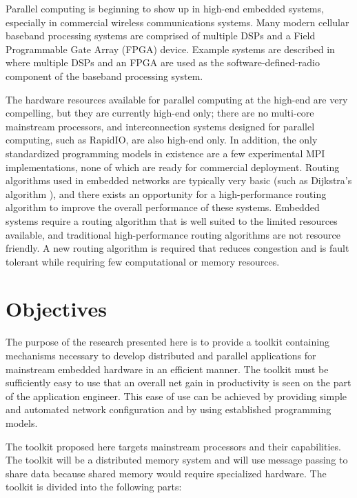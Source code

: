 Parallel computing is beginning to show up in high-end embedded systems, especially in commercial wireless communications systems. Many modern cellular baseband processing systems are comprised of multiple DSPs and a Field Programmable Gate Array (FPGA) device. Example systems are described in \cite{ref:2007-wilson-using_serial_rapidio_switches} where multiple DSPs and an FPGA are used as the software-defined-radio component of the baseband processing system.

The hardware resources available for parallel computing at the high-end are very compelling, but they are currently high-end only; there are no multi-core mainstream processors, and interconnection systems designed for parallel computing, such as RapidIO, are also high-end only. In addition, the only standardized programming models in existence are a few experimental MPI implementations, none of which are ready for commercial deployment. Routing algorithms used in embedded networks are typically very basic (such as Dijkstra's algorithm \cite{ref:2006-black-dijkstras_algorithm}), and there exists an opportunity for a high-performance routing algorithm to improve the overall performance of these systems. Embedded systems require a routing algorithm that is well suited to the limited resources available, and traditional high-performance routing algorithms are not resource friendly. A new routing algorithm is required that reduces congestion and is fault tolerant while requiring few computational or memory resources.

\section{Objectives}\label{sec:introduction:objectives}

The purpose of the research presented here is to provide a toolkit containing mechanisms necessary to develop distributed and parallel applications for mainstream embedded hardware in an efficient manner. The toolkit must be sufficiently easy to use that an overall net gain in productivity is seen on the part of the application engineer. This ease of use can be achieved by providing simple and automated network configuration and by using established programming models.

The toolkit proposed here targets mainstream processors and their capabilities. The toolkit will be a distributed memory system and will use message passing to share data because shared memory would require specialized hardware. The toolkit is divided into the following parts:

